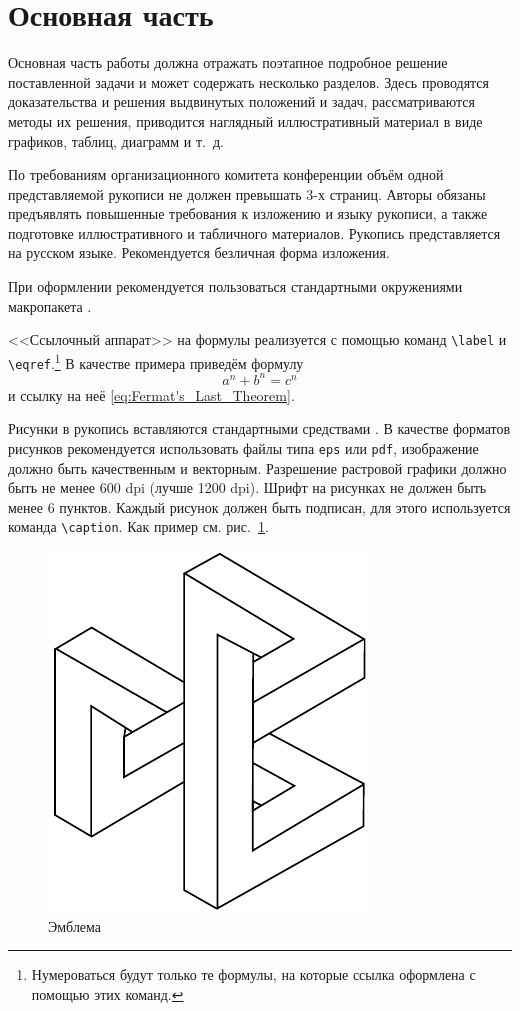\documentclass[60x84/16,8pt]{ittmm}
\begin{document}
\section{Основная часть} 
\label{sec:base-section}

Основная часть работы должна отражать поэтапное подробное решение
поставленной задачи и может содержать несколько разделов. Здесь
проводятся доказательства и решения выдвинутых положений и задач,
рассматриваются методы их решения, приводится наглядный иллюстративный
материал в виде графиков, таблиц, диаграмм и т.~д.

По требованиям организационного комитета конференции объём одной
представляемой рукописи не должен превышать 3-х страниц. Авторы
обязаны предъявлять повышенные требования к изложению и языку
рукописи, а также подготовке иллюстративного и табличного материалов.
Рукопись представляется на русском языке.  Рекомендуется безличная
форма изложения.

При оформлении рекомендуется пользоваться стандартными окружениями
макропакета \LaTeXe.

<<Ссылочный аппарат>> на формулы реализуется с помощью команд
\verb"\label" и \verb"\eqref".\footnote{Нумероваться будут только те
  формулы, на которые ссылка оформлена с помощью этих команд.}  В
качестве примера приведём формулу
\begin{equation}
a^n+b^n=c^n
\label{eq:Fermat's_Last_Theorem}
\end{equation}
и ссылку на неё \eqref{eq:Fermat's_Last_Theorem}.

Рисунки в рукопись вставляются стандартными средствами \LaTeXe.  В
качестве форматов рисунков рекомендуется использовать файлы типа
\texttt{eps} или \texttt{pdf}, изображение должно быть качественным и
векторным. Разрешение растровой графики должно быть не менее 600 dpi
(лучше 1200 dpi). Шрифт на рисунках не должен быть менее 6 пунктов.
Каждый рисунок должен быть подписан, для этого
используется команда \verb"\caption". 
Как пример см. рис.~\ref{fig:logo}.

\begin{figure}
  \centering
  \includegraphics[width=0.2\linewidth]{embl}
  \caption{Эмблема}
  \label{fig:logo}
\end{figure}
\end{document}
